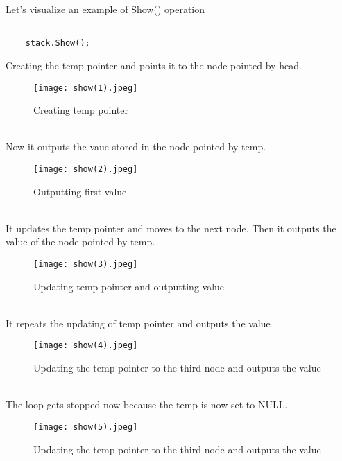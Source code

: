 \documentclass[11pt,fleqn]{book} %
\begin{document}
Let's visualize an example of Show() operation
\begin{example}
  \begin{lstlisting}
    
    stack.Show();
  \end{lstlisting}
  Creating the temp pointer and points it to the node pointed by head.
  \begin{figure}[H]
    \centering
    \texttt{[image: show(1).jpeg]}
    \caption{Creating temp pointer}
  \end{figure} ~\\
  Now it outputs the vaue stored in the node pointed by temp.
  \begin{figure}[H]
    \centering
    \texttt{[image: show(2).jpeg]}
    \caption{Outputting first value}
  \end{figure} ~\\
  It updates the temp pointer and moves to the next node. Then it outputs the value of the node pointed by temp.
  \begin{figure}[H]
    \centering
    \texttt{[image: show(3).jpeg]}
    \caption{Updating temp pointer and outputting value}
  \end{figure} ~\\
  It repeats the updating of temp pointer and outputs the value
  \begin{figure}[H]
    \centering
    \texttt{[image: show(4).jpeg]}
    \caption{Updating the temp pointer to the third node and outputs the value}
  \end{figure} ~\\
  The loop gets stopped now because the temp is now set to NULL.
  \begin{figure}[H]
    \centering
    \texttt{[image: show(5).jpeg]}
    \caption{Updating the temp pointer to the third node and outputs the value}
  \end{figure}
\end{example}
\newpage
\end{document}
